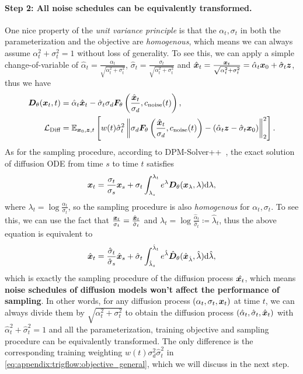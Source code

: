 \paragraph{Step 2: All noise schedules can be equivalently transformed.} One nice property of the \textit{unit variance principle} is that the $\alpha_t, \sigma_t$ in both the parameterization and the objective are \textit{homogenous}, which means we can always assume $\alpha_t^2 + \sigma_t^2 = 1$ without loss of generality. To see this, we can apply a simple change-of-variable of $\hat{\alpha}_t = \frac{\alpha_t}{\sqrt{\alpha_t^2 + \sigma_t^2}}$, $\hat{\sigma}_t = \frac{\sigma_t}{\sqrt{\alpha_t^2 + \sigma_t^2}}$ and $\hat{{\bm{x}}}_t = \frac{{\bm{x}}_t}{\sqrt{\alpha_t^2+\sigma_t^2}}=\hat{\alpha}_t {\bm{x}}_0 + \hat{\sigma}_t {\bm{z}}$, thus we have
\begin{align}
    {\bm{D}}_\theta({\bm{x}}_t,t) &= \hat{\alpha}_t \hat{{\bm{x}}}_t - \hat{\sigma}_t \sigma_d {\bm{F}}_\theta\left(\frac{\hat{{\bm{x}}}_t}{\sigma_d }, c_{\text{noise}}(t)\right), \\
    {\mathcal{L}}_{\text{Diff}} &= \mathbb{E}_{{\bm{x}}_0,{\bm{z}},t}\left[
        w(t) \hat{\sigma}_t^2
        \left\| \sigma_d {\bm{F}}_\theta\left(\frac{\hat{{\bm{x}}}_t}{\sigma_d}, c_{\text{noise}}(t)\right)
        - (\hat{\alpha}_t {\bm{z}} - \hat{\sigma}_t {\bm{x}}_0)
        \right\|_2^2 \label{eq:appendix:trigflow:objective_general}
    \right].
\end{align}
As for the sampling procedure, according to DPM-Solver++~\citep{lu2022dpm++}, the exact solution of diffusion ODE from time $s$ to time $t$ satisfies
\begin{equation}
    {\bm{x}}_t = \frac{\sigma_t}{\sigma_s}{\bm{x}}_s + \sigma_t \int_{\lambda_s}^{\lambda_t}e^\lambda {\bm{D}}_\theta({\bm{x}}_\lambda, \lambda)\mathrm{d}\lambda,
\end{equation}
where $\lambda_t = \log\frac{\alpha_t}{\sigma_t}$, so the sampling procedure is also \textit{homogenous} for $\alpha_t,\sigma_t$. To see this, we can use the fact that $\frac{{\bm{x}}_t}{\sigma_t}  = \frac{\hat{{\bm{x}}}_t}{\hat{\sigma}_t}$ and $\lambda_t = \log \frac{\hat{\alpha}_t}{\hat{\sigma}_t} 
\coloneqq \hat{\lambda}_t$, thus the above equation is equivalent to
\begin{equation}
    \hat{{\bm{x}}}_t = \frac{\hat{\sigma}_t}{\hat{\sigma}_s}\hat{{\bm{x}}}_s + \hat{\sigma}_t \int_{\hat{\lambda}_s}^{\hat{\lambda}_t}e^{\hat{\lambda}} \hat{{\bm{D}}}_\theta(\hat{{\bm{x}}}_{\hat{\lambda}}, \hat{\lambda})\mathrm{d}\hat{\lambda},
\end{equation}
which is exactly the sampling procedure of the diffusion process $\hat{{\bm{x}}_t}$, which means \textbf{noise schedules of diffusion models won't affect the performance of sampling}. In other words, for any diffusion process $(\alpha_t, \sigma_t, {\bm{x}}_t)$ at time $t$, we can always divide them by $\sqrt{\alpha_t^2 + \sigma_t^2}$ to obtain the diffusion process $(\hat{\alpha}_t, \hat{\sigma}_t, \hat{{\bm{x}}}_t)$ with $\hat{\alpha}_t^2 + \hat{\sigma}_t^2 = 1$ and all the parameterization, training objective and sampling procedure can be equivalently transformed. The only difference is the corresponding training weighting $w(t) \sigma^2_d \hat{\sigma}_t^2$ in \eqref{eq:appendix:trigflow:objective_general}, which we will discuss in the next step.

